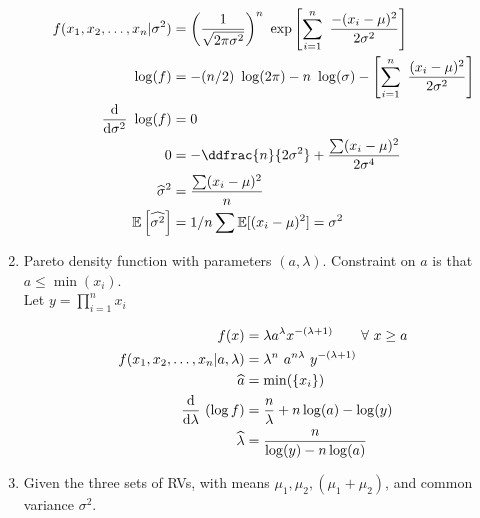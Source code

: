 \begin{enumerate}
	\begin{subequations}
	\begin{align}
		f(x_1, x_2, \dots, x_n | \sigma^2) &= \left(\frac{1}{\sqrt{2\pi\sigma^2}}\right)^n\ \exp \left[\sum\limits_{i=1}^{n}\ \frac{-(x_i - \mu)^2}{2\sigma^2}\right] \nonumber \\
		\log(f) &= -(n/2)\ \log(2\pi) - n\ \log(\sigma) - \left[\sum\limits_{i=1}^{n}\ \frac{(x_i - \mu)^2}{2\sigma^2}\right] \\
		\frac{\mathrm{d}}{\mathrm{d} \sigma^2}\ \log(f) &= 0 \nonumber \\
		0 &= -\ddfrac{n}{2\sigma^2} + \frac{\sum (x_i - \mu)^2}{2\sigma^4} \nonumber \\
		\widehat{\sigma}^2 &= \frac{\sum (x_i - \mu)^2}{n} \\
		\mathbb{E}\left[\widehat{\sigma^2}\right] &= 1/n \sum \mathbb{E}[(x_i - \mu)^2] = \sigma^2
	\end{align}\\
	\end{subequations}
	\item Pareto density function with parameters $ (a, \lambda) $. Constraint on $ a $ is that $ a \leq \min({x_i}) $. \\
	Let $ y = \prod\limits_{i=1}^{n} x_i $
	
	\begin{subequations}
	\begin{align}
		f(x) &= \lambda a^\lambda x^{-(\lambda+1)} \qquad \forall\ x \geq a \nonumber \\
		f(x_1, x_2, \dots, x_n | a, \lambda) &= \lambda^n\ a^{n\lambda}\ y^{-(\lambda + 1)} \\
		\widehat{a} &= \min(\{x_i\}) \\
		\frac{\mathrm{d}}{\mathrm{d} \lambda}\ (\log f) &= \frac{n}{\lambda} + n \log (a) - \log (y) \nonumber \\
		\widehat{\lambda} &= \frac{n}{\log (y) - n \log (a)}
	\end{align}\\
	\end{subequations}

	\item Given the three sets of RVs, with means $ \mu_1, \mu_2, (\mu_1 + \mu_2) $, and common variance $ \sigma^2 $. \\
	

\end{enumerate}
